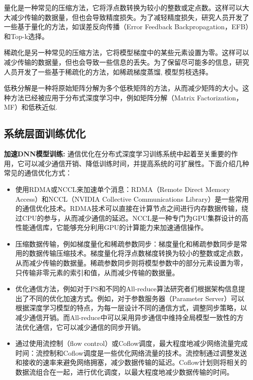 量化是一种常见的压缩方法，它将浮点数转换为较小的整数或定点数。这样可以大大减少传输的数据量，但也会导致精度损失。为了减轻精度损失，研究人员开发了一些基于量化的方法，如误差反向传播（Error Feedback Backpropagation，EFB）和Top-k选择。

稀疏化是另一种常见的压缩方法，它将模型梯度中的某些元素设置为零。这样可以减少传输的数据量，但也会导致一些信息的丢失。为了保留尽可能多的信息，研究人员开发了一些基于稀疏化的方法，如稀疏梯度蒸馏, 模型剪枝选择。

低秩分解是一种将原始矩阵分解为多个低秩矩阵的方法，从而减少矩阵的大小。这种方法已经被应用于分布式深度学习中，例如矩阵分解（Matrix Factorization，MF）和低秩近似.

\subsection{系统层面训练优化}

\noindent \textbf{加速DNN模型训练:}
通信优化在分布式深度学习训练系统中起着至关重要的作用，它可以减少通信开销、降低训练时间，并提高系统的可扩展性。下面介绍几种常见的通信优化方式：
\begin{itemize}
    \item 使用RDMA或NCCL来加速单个消息：RDMA（Remote Direct Memory Access）和NCCL（NVIDIA Collective Communications Library）是一些常用的通信优化技术。RDMA技术可以直接在计算节点之间进行内存数据传输，绕过CPU的参与，从而减少通信的延迟。NCCL是一种专门为GPU集群设计的高性能通信库，它能够充分利用GPU的计算能力来加速通信操作。
    \item 压缩数据传输，例如梯度量化和稀疏参数同步：梯度量化和稀疏参数同步是常用的数据传输压缩技术。梯度量化将浮点数梯度转换为较小的整数或定点数，从而减少传输的数据量。稀疏参数同步则将模型参数中的部分元素设置为零，只传输非零元素的索引和值，从而减少传输的数据量。
    \item 优化通信方法，例如对于PS和不同的All-reduce算法研究者们根据架构信息提出了不同的优化加速方式。例如，对于参数服务器（Parameter Server）可以根据深度学习模型的特点，为每一层设计不同的通信方式，调整同步策略，以减少通信开销。而All-reduce中可以采用异步通信中维持全局模型一致性的方法优化通信，它可以减少通信的同步开销。
    \item 通过使用流控制（flow control）或Coflow调度，最大程度地减少网络流量完成时间：流控制和Coflow调度是一些优化网络流量的技术。流控制通过调整发送和接收的速率来避免网络拥塞，减少数据传输的延迟。Coflow计划则将相关的数据流组合在一起，进行优化调度，以最大程度地减少数据传输的时间。
\end{itemize}


